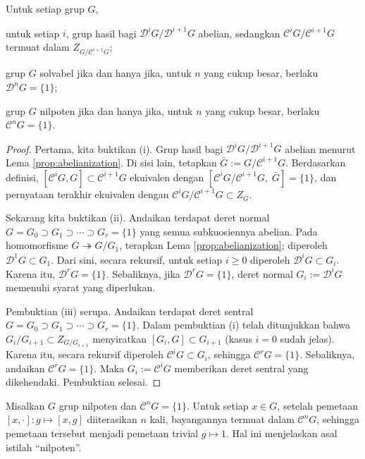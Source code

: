 \begin{lemma}\label{prop:solvable-nilpotent-characterization}
	Untuk setiap grup $G$,
	\begin{compactenum}[(i)]
		\item untuk setiap $i$, grup hasil bagi $\mathscr{D}^i G/\mathscr{D}^{i+1} G$ abelian, sedangkan $\mathscr{C}^i G/\mathscr{C}^{i+1} G$ termuat dalam $Z_{G/\mathscr{C}^{i+1} G}$;
		\item grup $G$ solvabel jika dan hanya jika, untuk $n$ yang cukup besar, berlaku $\mathscr{D}^n G = \{1\}$;
		\item grup $G$ nilpoten jika dan hanya jika, untuk $n$ yang cukup besar, berlaku $\mathscr{C}^n G = \{1\}$.
	\end{compactenum}
\end{lemma}
\begin{proof}
	Pertama, kita buktikan (i). Grup hasil bagi $\mathscr{D}^i G/\mathscr{D}^{i+1} G$ abelian menurut Lema \ref{prop:abelianization}. Di sisi lain, tetapkan $\bar{G} := G/\mathscr{C}^{i+1}G$. Berdasarkan definisi, $[\mathscr{C}^i G, G] \subset \mathscr{C}^{i+1}G$ ekuivalen dengan $[\mathscr{C}^i G/\mathscr{C}^{i+1} G, \;\bar{G}] = \{1\}$, dan pernyataan terakhir ekuivalen dengan $\mathscr{C}^i G/\mathscr{C}^{i+1} G \subset Z_{\bar{G}}$.

	Sekarang kita buktikan (ii). Andaikan terdapat deret normal $G = G_0 \supset G_1 \supset \cdots \supset G_r = \{1\}$ yang semua subkuosiennya abelian. Pada homomorfisme $G \twoheadrightarrow G/G_1$, terapkan Lema \ref{prop:abelianization}; diperoleh $\mathscr{D}^1 G \subset G_1$. Dari sini, secara rekursif, untuk setiap $i \geq 0$ diperoleh $\mathscr{D}^i G \subset G_i$. Karena itu, $\mathscr{D}^r G = \{1\}$. Sebaliknya, jika $\mathscr{D}^r G = \{1\}$, deret normal $G_i := \mathscr{D}^i G$ memenuhi syarat yang diperlukan.

	Pembuktian (iii) serupa. Andaikan terdapat deret sentral $G = G_0 \supset G_1 \supset \cdots \supset G_r = \{1\}$. Dalam pembuktian (i) telah ditunjukkan bahwa $G_i/G_{i+1} \subset Z_{G/G_{i+1}}$ menyiratkan $[G_i, G] \subset G_{i+1}$ (kasus $i=0$ sudah jelas). Karena itu, secara rekursif diperoleh $\mathscr{C}^i G \subset G_i$, sehingga $\mathscr{C}^r G = \{1\}$. Sebaliknya, andaikan $\mathscr{C}^r G = \{1\}$. Maka $G_i := \mathscr{C}^i G$ memberikan deret sentral yang dikehendaki. Pembuktian selesai.
\end{proof}

\begin{remark}
	Misalkan $G$ grup nilpoten dan $\mathscr{C}^n G = \{1\}$. Untuk setiap $x \in G$, setelah pemetaan $[x, \cdot]: g \mapsto [x, g]$ diiterasikan $n$ kali, bayangannya termuat dalam $\mathscr{C}^n G$, sehingga pemetaan tersebut menjadi pemetaan trivial $g \mapsto 1$. Hal ini menjelaskan asal istilah ``nilpoten''.
\end{remark}

